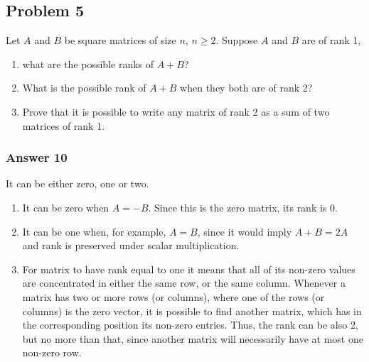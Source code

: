 \documentclass[11pt]{article}
\begin{document}
\subsection{Problem 5}
\label{sec-1-5}
Let $A$ and $B$ be square matrices of size $n$, $n \geq 2$.  Suppose $A$ and
$B$ are of rank 1, 
\begin{enumerate}
\item what are the possible ranks of $A + B$?
\item What is the possible rank of $A + B$ when they both are of rank 2?
\item Prove that it is possible to write any matrix of rank 2 as a sum of
two matrices of rank 1.
\end{enumerate}

\subsubsection{Answer 10}
\label{sec-1-5-1}
It can be either zero, one or two.
\begin{enumerate}
\item It can be zero when $A = -B$.  Since this is the zero matrix, its rank is 0.
\item It can be one when, for example, $A = B$, since it would imply $A + B =
       2A$ and rank is preserved under scalar multiplication.
\item For matrix to have rank equal to one it means that all of its non-zero
values are concentrated in either the same row, or the same column.
Whenever a matrix has two or more rows (or columns), where one of the
rows (or columns) is the zero vector, it is possible to find another
matrix, which has in the corresponding position its non-zero entries.
Thus, the rank can be also 2, but no more than that, since another matrix
will necessarily have at most one non-zero row.
\end{enumerate}
\end{document}
